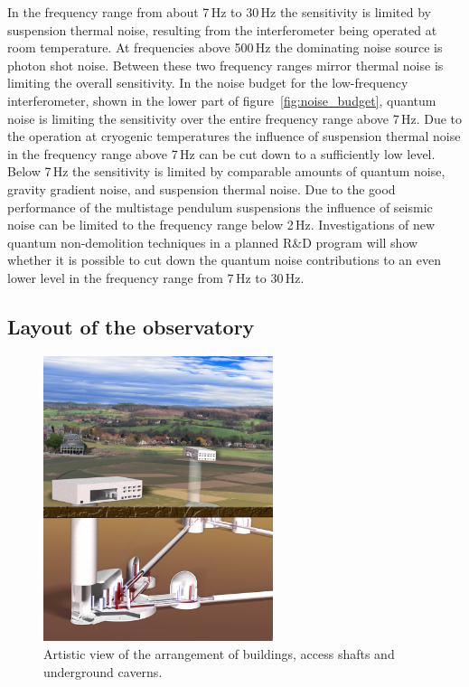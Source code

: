 In the frequency range from about 7\,Hz to 30\,Hz the sensitivity is limited by
suspension thermal noise, resulting from the interferometer being operated 
at room temperature. At frequencies above 500\,Hz the dominating noise 
source is photon shot noise. Between these two frequency ranges mirror 
thermal noise is limiting the overall sensitivity. In the noise budget for the 
low-frequency interferometer, shown in the lower part of 
figure~\ref{fig:noise_budget}, quantum noise is limiting the sensitivity over 
the entire frequency range above 7\,Hz. Due to the operation at cryogenic 
temperatures the influence of suspension thermal noise in the frequency 
range above 7\,Hz can be cut down to a sufficiently low level. Below 7\,Hz 
the sensitivity is limited by comparable amounts of quantum noise, 
gravity gradient noise, and suspension thermal noise. Due to the good 
performance of the multistage pendulum suspensions the influence of 
seismic noise can be limited to the frequency range below 2\,Hz. Investigations 
of new quantum non-demolition techniques in a planned R\&D program will 
show whether it is possible to cut down the quantum noise contributions to 
an even lower level in the frequency range from 7\,Hz to 30\,Hz.

\FloatBarrier
\clearpage
\subsection{Layout of the observatory}

\begin{figure}
\centering
\vskip -0.35cm
\includegraphics[width=0.6\textwidth]{Sec_Introduction/ArtisticViewBuildings.jpg}
\vskip 0.3cm
\caption{Artistic view of the arrangement of buildings, access shafts and underground caverns.}
\vskip -0.1cm
\label{Fig:Buildings}
\end{figure} 

